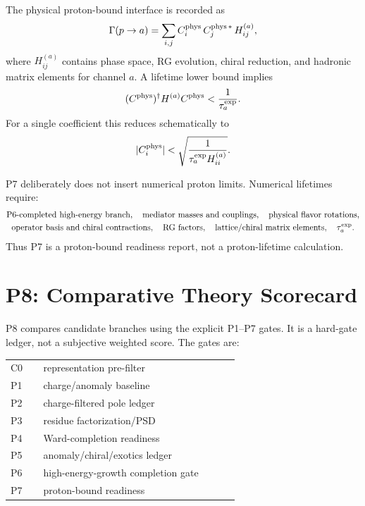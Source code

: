 \documentclass[11pt]{article}
\begin{document}
The physical proton-bound interface is recorded as
\begin{equation}
  \Gamma(p\to a)
  =
  \sum_{i,j}
  C_i^{\rm phys}\,
  C_j^{\rm phys\,\ast}\,
  H_{ij}^{(a)},
\end{equation}
where $H_{ij}^{(a)}$ contains phase space, RG evolution, chiral reduction, and
hadronic matrix elements for channel $a$.  A lifetime lower bound implies
\begin{equation}
  (C^{\rm phys})^\dagger H^{(a)} C^{\rm phys}
  <
  \frac{1}{\tau_a^{\rm exp}}.
\end{equation}
For a single coefficient this reduces schematically to
\begin{equation}
  |C_i^{\rm phys}|
  <
  \sqrt{\frac{1}{\tau_a^{\rm exp}H_{ii}^{(a)}}}.
\end{equation}

P7 deliberately does not insert numerical proton limits.  Numerical
lifetimes require:
\begin{equation}
\begin{gathered}
  \text{P6-completed high-energy branch},\quad
  \text{mediator masses and couplings},\quad
  \text{physical flavor rotations},\\
  \text{operator basis and chiral contractions},\quad
  \text{RG factors},\quad
  \text{lattice/chiral matrix elements},\quad
  \tau_a^{\rm exp}.
\end{gathered}
\end{equation}
Thus P7 is a proton-bound readiness report, not a proton-lifetime
calculation.

\section{P8: Comparative Theory Scorecard}

P8 compares candidate branches using the explicit P1--P7 gates.  It is a
hard-gate ledger, not a subjective weighted score.  The gates are:
\begin{center}
\small
\begin{tabular}{
  >{\raggedright\arraybackslash}p{0.12\linewidth}
  >{\raggedright\arraybackslash}p{0.72\linewidth}}
C0 & representation pre-filter\\
P1 & charge/anomaly baseline\\
P2 & charge-filtered pole ledger\\
P3 & residue factorization/PSD\\
P4 & Ward-completion readiness\\
P5 & anomaly/chiral/exotics ledger\\
P6 & high-energy-growth completion gate\\
P7 & proton-bound readiness
\end{tabular}
\end{center}
\end{document}
